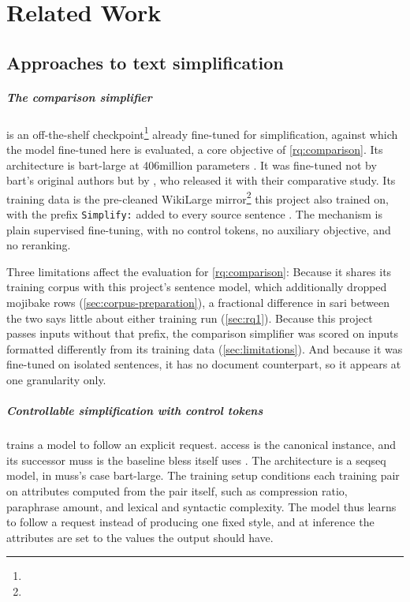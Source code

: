 \chapter{Related Work}
\label{sec:related}

\section{Approaches to text simplification}
\label{sec:related-baselines}

\paragraph{The comparison simplifier} is an off-the-shelf checkpoint\footnote{} already fine-tuned for simplification, against which the model fine-tuned here is evaluated, a core objective of \cref{rq:comparison}.
Its architecture is \gls{bart}-large \parencite[7872]{lewis-etal-2020-bart} at 406\gls{million} parameters \parencite[2]{cohen2026simplify}.
It was fine-tuned not by \gls{bart}'s original authors but by \textcite[1, 4]{cohen2026simplify}, who released it with their comparative study.
Its training data is the pre-cleaned WikiLarge mirror\footnote{} this project also trained on, with the prefix \texttt{Simplify:} added to every source sentence \parencite[3--4]{cohen2026simplify}.
The mechanism is plain supervised fine-tuning, with no control tokens, no auxiliary objective, and no reranking.

Three limitations affect the evaluation for \cref{rq:comparison}:
Because it shares its training corpus with this project's sentence model, which additionally dropped mojibake rows (\cref{sec:corpus-preparation}), a fractional difference in \gls{sari} between the two says little about either training run (\cref{sec:rq1}).
Because this project passes inputs without that prefix, the comparison simplifier was scored on inputs formatted differently from its training data (\cref{sec:limitations}).
And because it was fine-tuned on isolated sentences, it has no document counterpart, so it appears at one granularity only.

\paragraph{Controllable simplification with control tokens} trains a model to follow an explicit request.
\Gls{access} \parencite[4691]{martin-etal-2020-controllable} is the canonical instance, and its successor \gls{muss} \parencite[1653]{martin-etal-2022-muss} is the baseline \gls{bless} itself uses \parencite[13293]{kew-etal-2023-bless}.
The architecture is a \gls{seqseq} model, in \gls{muss}'s case \gls{bart}-large.
The training setup conditions each training pair on attributes computed from the pair itself, such as compression ratio, paraphrase amount, and lexical and syntactic complexity.
The model thus learns to follow a request instead of producing one fixed style, and at inference the attributes are set to the values the output should have.

